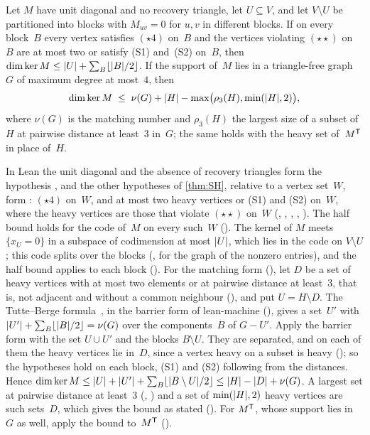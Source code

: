 \begin{corollary}\label{cor:SH}
Let $M$ have unit diagonal and no recovery triangle, let $U\subseteq V$, and let $V\setminus U$ be partitioned into blocks with
$M_{uv}=0$ for $u,v$ in different blocks. If on every block~$B$ every vertex satisfies $(\star4)$ on~$B$ and the vertices
violating $(\star\star)$ on~$B$ are at most two or satisfy (S1) and~(S2) on~$B$, then
$\dim\ker M\le\lvert U \rvert+\sum_B\lfloor\lvert B \rvert/2\rfloor$. If the support of~$M$ lies in a triangle-free graph~$G$ of maximum degree at
most~$4$, then
\[
  \dim\ker M\;\le\;\nu(G)+\lvert H \rvert-\max\bigl(\rho_3(H),\min(\lvert H \rvert,2)\bigr),
\]
where $\nu(G)$ is the matching number and $\rho_3(H)$ the largest size of a subset of~$H$ at pairwise distance at least~$3$
in~$G$; the same holds with the heavy set of~$M^{\mathsf{T}}$ in place of~$H$.
\end{corollary}

\begin{outline}
In Lean the unit diagonal and the absence of recovery triangles form the hypothesis , and
the other hypotheses of \cref{thm:SH}, relative to a vertex set~$W$, form : $(\star4)$ on~$W$, and at most two heavy
vertices or (S1) and (S2) on~$W$, where the heavy vertices are those that violate $(\star\star)$ on~$W$ (,
, , , ). The half bound holds for the code of~$M$ on every such~$W$
(). The kernel of $M$ meets $\{x_U=0\}$ in a
subspace of codimension at most $\lvert U \rvert$, which lies in the code on $V\setminus U$; this code splits over the blocks
(, for the graph of the nonzero entries), and the half bound applies to each
block (). For the matching form (), let $D$ be a set of
heavy vertices with at most two elements or at pairwise distance at least~$3$, that is, not adjacent and without a common
neighbour (), and put $U=H\setminus D$. The Tutte--Berge formula~\cite{Berge1958}, in the barrier form of
lean-machine (), gives a set~$U'$ with
$\lvert U' \rvert+\sum_B\lfloor\lvert B \rvert/2\rfloor=\nu(G)$ over the components~$B$ of $G-U'$. Apply the barrier form with the set
$U\cup U'$ and the blocks $B\setminus U$. They are separated, and on each of them the heavy vertices lie in~$D$, since a vertex
heavy on a subset is heavy (); so the hypotheses hold on each block, (S1) and (S2) following from the
distances. Hence $\dim\ker M\le\lvert U \rvert+\lvert U' \rvert+\sum_B\lfloor\lvert B\setminus U \rvert/2\rfloor\le\lvert H \rvert-\lvert D \rvert+\nu(G)$. A largest
set at pairwise distance at least~$3$ (, ) and a set of $\min(\lvert H \rvert,2)$ heavy vertices are such
sets~$D$, which gives the bound as stated (). For $M^{\mathsf{T}}$, whose support lies in~$G$ as
well, apply the bound to~$M^{\mathsf{T}}$ ().
\end{outline}

